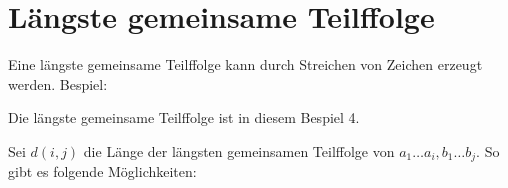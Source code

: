 \section{Längste gemeinsame Teilffolge}
Eine längste gemeinsame Teilffolge kann durch Streichen von Zeichen erzeugt werden.
Bespiel:
\begin{figure}[htbp]
	\begin{center}
	\end{center}
\end{figure}
Die längste gemeinsame Teilffolge ist in diesem Bespiel 4.


Sei \(d(i,j)\) die Länge der längsten gemeinsamen Teilffolge von \(a_{1} \ldots a_{i}, b_{1} \ldots b_{j}\).
So gibt es folgende Möglichkeiten:

